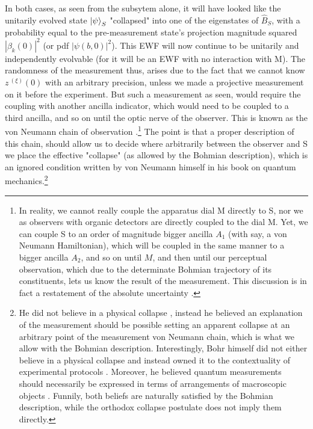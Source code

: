 \documentclass[11pt, a4paper]{article} %
\begin{document}


In both cases, as seen from the subsytem alone, it will have looked like the unitarily evolved state $\ket{\psi}_S$ "collapsed" into one of the eigenstates of $\hat{B}_S$, with a probability equal to the pre-measurement state's projection magnitude squared $|\beta_k(0)|^2$ (or pdf $|\psi(b,0)|^2$). This EWF will now continue to be unitarily and independently evolvable (for it will be an EWF with no interaction with M). The randomness of the measurement thus, arises due to the fact that we cannot know $z^{\:(\xi)}(0)$ with an arbitrary precision, unless we made a projective measurement on it before the experiment. But such a measurement as seen, would require the coupling with another ancilla indicator, which would need to be coupled to a third ancilla, and so on until the optic nerve of the observer. This is known as the von Neumann chain of observation \cite{vonNeumann}.\footnote{In reality, we cannot really couple the apparatus dial M directly to S, nor we as observers with organic detectors are directly coupled to the dial M. Yet, we can couple S to an order of magnitude bigger ancilla $A_1$ (with say, a von Neumann Hamiltonian), which will be coupled in the same manner to a bigger ancilla $A_2$, and so on until $M$, and then until our perceptual observation, which due to the determinate Bohmian trajectory of its constituents, lets us know the result of the measurement. This discussion is in fact a restatement of the absolute uncertainty \cite{Absolute}.} The point is that a proper description of this chain, should allow us to decide where arbitrarily between the observer and S we place the effective "collapse" (as allowed by the Bohmian description), which is an ignored condition written by von Neumann himself \cite{NeumannNoCollapse} in his book on quantum mechanics.\footnote{He did not believe in a physical collapse \cite{NeumannNoCollapse}, instead he believed an explanation of the measurement should be possible setting an apparent collapse at an arbitrary point of the measurement von Neumann chain, which is what we allow with the Bohmian description. Interestingly, Bohr himself did not either believe in a physical collapse and instead owned it to the contextuality of experimental protocols \cite{Dirac}. Moreover, he believed quantum measurements should necessarily be expressed in terms of arrangements of macroscopic objects \cite{Bohr}. Funnily, both beliefs are naturally satisfied by the Bohmian description, while the orthodox collapse postulate does not imply them directly.
}\vspace{-0.1cm}
\end{document}
